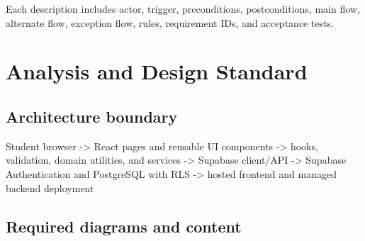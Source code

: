 \documentclass[
  10pt,
  a4paper,
  oneside]{report}
\newenvironment{Shaded}{}{}
\newcommand{\NormalTok}[1]{#1}
\begin{document}
Each description includes actor, trigger, preconditions, postconditions,
main flow, alternate flow, exception flow, rules, requirement IDs, and
acceptance tests.

\chapter{Analysis and Design
Standard}\label{15-analysis-and-design-standard}

\section{Architecture boundary}\label{151-architecture-boundary}

\begin{Shaded}
\begin{Highlighting}[]
\NormalTok{Student browser}
\NormalTok{  {-}\textgreater{} React pages and reusable UI components}
\NormalTok{  {-}\textgreater{} hooks, validation, domain utilities, and services}
\NormalTok{  {-}\textgreater{} Supabase client/API}
\NormalTok{  {-}\textgreater{} Supabase Authentication and PostgreSQL with RLS}
\NormalTok{  {-}\textgreater{} hosted frontend and managed backend deployment}
\end{Highlighting}
\end{Shaded}

\section{Required diagrams and
content}\label{152-required-diagrams-and-content}
\end{document}

